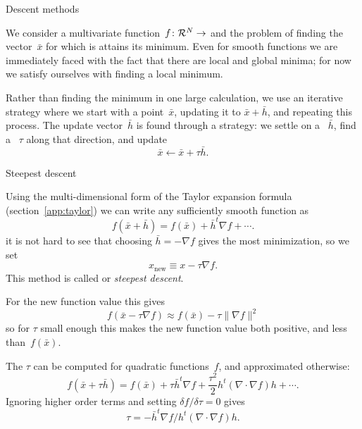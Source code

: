 
 {Descent methods}
\label{app::descent}

We consider a multivariate function~$f\colon {\cal R}^N\rightarrow $ and the
problem of finding the vector~$\bar x$ for which is attains its
minimum. Even for smooth functions we are immediately faced with the
fact that there are local and global minima; for now we satisfy
ourselves with finding a local minimum.

Rather than finding the minimum in one large calculation, we use an
iterative strategy where we start with a point~$\bar x$,
updating it to $\bar x+\bar h$, and repeating this process.
The update vector~$\bar h$ is found through a 
strategy:
we settle on a ~$\bar h$,
find a ~$\tau$ along that direction, and update
\[ \bar x\leftarrow \bar x+\tau \bar h. \]

 {Steepest descent}

Using the multi-dimensional form of the Taylor expansion formula
(section~\ref{app:taylor}) we can write any sufficiently smooth
function as
\[ f(\bar x+\bar h) = f(\bar x) + \bar h^t \nabla f +\cdots. \]
it is not hard to see that choosing $\bar h=-\nabla f$ gives the most
minimization, so we set
\[ x_{\scriptstyle\mathrm{new}}\equiv x-\tau \nabla f. \]
This method is called 
or
\emph{steepest descent}.

For the new function value this gives
\[ f(\bar x - \tau \nabla f ) \approx f(\bar x) - \tau \| \nabla f \|^2 \]
so for $\tau$ small enough this makes the new function value both
positive, and less than~$f(\bar x)$.

The  $\tau$ can be computed for quadratic
functions~$f$, and approximated otherwise:
\[ f(\bar x+\tau\bar h) = f(\bar x) + \tau\bar h^t \nabla f +
\frac{\tau^2}2 h^t (\nabla\cdot\nabla f) h +\cdots. \]
Ignoring higher order terms and setting
$\delta f/\delta\tau=0$
gives
\[ \tau = - \bar h^t \nabla f / h^t (\nabla\cdot\nabla f) h. \]

